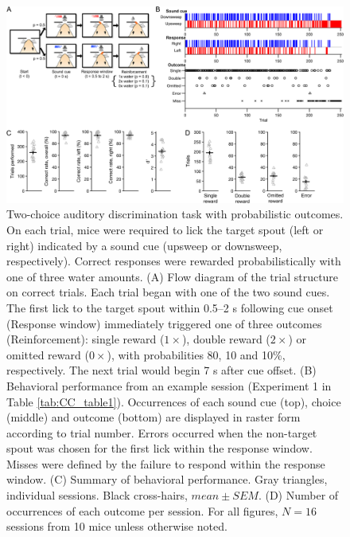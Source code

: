 \begin{figure}[htbp]

\begin{center}
\includegraphics[width=\textwidth]{Figures/CC_fig1.png} 
\end{center}

\caption[Two-choice auditory discrimination task with probabilistic outcomes.]
{Two-choice auditory discrimination task with probabilistic outcomes. On each trial, mice were required to lick the target spout (left or right) indicated by a sound cue (upsweep or downsweep, respectively). Correct responses were rewarded probabilistically with one of three water amounts. (A) Flow diagram of the trial structure on correct trials. Each trial began with one of the two sound cues. The first lick to the target spout within 0.5–2 s following cue onset (Response window) immediately triggered one of three outcomes (Reinforcement): single reward ($1\times$), double reward ($2\times$) or omitted reward ($0\times$), with probabilities 80, 10 and 10\%, respectively. The next trial would begin 7 s after cue offset. (B) Behavioral performance from an example session (Experiment 1 in Table \ref{tab:CC_table1}). Occurrences of each sound cue (top), choice (middle) and outcome (bottom) are displayed in raster form according to trial number. Errors occurred when the non-target spout was chosen for the first lick within the response window. Misses were defined by the failure to respond within the response window. (C) Summary of behavioral performance. Gray triangles, individual sessions. Black cross-hairs, $mean \pm SEM$. (D) Number of occurrences of each outcome per session. For all figures, $N = 16$ sessions from 10 mice unless otherwise noted.}

\label{fig:CC_fig1}
\end{figure}
